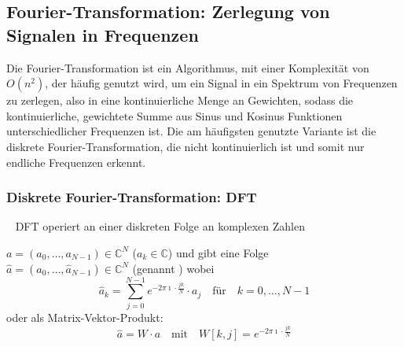 \subsection{Fourier-Transformation: Zerlegung von Signalen in Frequenzen}
Die Fourier-Transformation ist ein Algorithmus, mit einer Komplexität von \(O\left(n^2\right) \), der häufig genutzt wird, um ein Signal in ein Spektrum von Frequenzen zu zerlegen, also in eine kontinuierliche Menge an Gewichten, sodass die kontinuierliche, gewichtete Summe aus Sinus und Kosinus Funktionen unterschiedlicher Frequenzen ist. Die am häufigsten genutzte Variante ist die diskrete Fourier-Transformation, die nicht kontinuierlich ist und somit nur endliche Frequenzen erkennt. \cite{don_h_johnson_58_2017}

\subsubsection{\textbf{Diskrete Fourier-Transformation: DFT}}\label{sec:DFT}~\newline
DFT operiert an einer diskreten Folge an komplexen Zahlen

\(a = (a_0,\dots,a_{N-1}) \in \mathbb{C}^N\) (\(a_k \in \mathbb{C}\)) und gibt eine Folge\\
\(\hat{a} = (\hat{a}_0,\dots,\hat{a}_{N-1}) \in \mathbb{C}^N\) (genannt )
wobei \[\hat{a}_k = \sum_{j=0}^{N-1}e^{-2\pi \imath\cdot\frac{jk}{N}}\cdot a_j \quad \text{für}\quad k = 0,\dots,N-1\] oder als Matrix-Vektor-Produkt: \cite{noauthor_diskrete_2024}
\[\hat{a} = W\cdot a \quad \text{mit} \quad W[k,j] = e^{-2\pi \imath \cdot\frac{jk}{N}}\]

